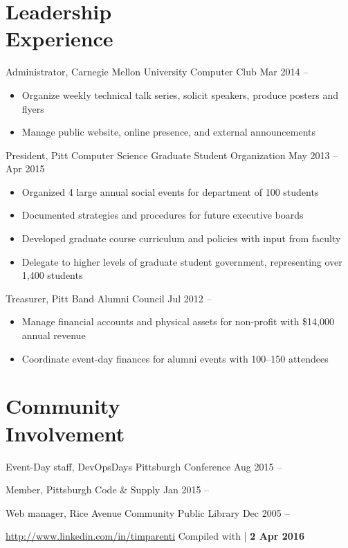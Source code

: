 \documentclass[11pt]{article}
\newcommand{\lmr}{\fontfamily{lmr}\selectfont} %
\newcommand{\textdb}[1]{\fontseries{db}\selectfont#1\normalfont}
\newcommand{\present}{\phantom{Xxx 20XX}}
\begin{document}
\section{Leadership\\ Experience}

\textdb{
Administrator, Carnegie Mellon University Computer Club
	\hfill Mar 2014 -- \present
}
\begin{itemize}
	\item Organize weekly technical talk series, solicit speakers, produce posters and flyers
	\item Manage public website, online presence, and external announcements
\end{itemize}

\textdb{
President, Pitt Computer Science Graduate Student Organization
	\hfill May 2013 -- Apr 2015
}
\begin{itemize}
	\item Organized 4 large annual social events for department of 100 students
	\item Documented strategies and procedures for future executive boards
	\item Developed graduate course curriculum and policies with input from faculty
	\item Delegate to higher levels of graduate student government,
		representing over 1,400 students
\end{itemize}

\textdb{
Treasurer, Pitt Band Alumni Council
	\hfill Jul 2012 -- \present
}
\begin{itemize}
	\item Manage financial accounts and physical assets
		for non-profit with \$14,000 annual revenue
	\item Coordinate event-day finances for alumni events with 100--150 attendees
\end{itemize}



\section{Community\\ Involvement}

\textdb{Event-Day staff,} DevOpsDays Pittsburgh Conference
	\hfill \textdb{Aug 2015 -- \present}

\textdb{Member,} Pittsburgh Code \& Supply
	\hfill \textdb{Jan 2015 -- \present}

\textdb{Web manager,} Rice Avenue Community Public Library
	\hfill \textdb{Dec 2005 -- \present}



\begin{adjustwidth}{-1in}{0pt}
	\hrulefill \par
	\hypersetup{linkcolor=gray}
	\small
	\url{http://www.linkedin.com/in/timparenti} \hfill {\lmr Compiled with \XeLaTeX} | \textbf{2 Apr 2016}
\end{adjustwidth}
\end{document}

